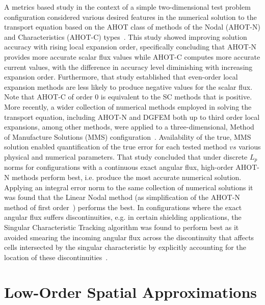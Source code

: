 A metrics based study in the context of a simple two-dimensional test problem configuration considered various desired features in the numerical solution to the transport equation based on the \ac{AHOT} class of methods of the Nodal (\ac{AHOT-N}) and Characteristics (\ac{AHOT-C}) types~\cite{Azmy1992}.
This study showed improving solution accuracy with rising local expansion order, specifically concluding that \ac{AHOT-N} provides more accurate scalar flux values while \ac{AHOT-C} computes more accurate current values, with the difference in accuracy level diminishing with increasing expansion order.
Furthermore, that study established that even-order local expansion methods are less likely to produce negative values for the scalar flux.
Note that \ac{AHOT-C} of order 0 is equivalent to the \ac{SC} methods that is positive.
More recently, a wider collection of numerical methods employed in solving the transport equation, including \ac{AHOT-N} and \ac{DGFEM} both up to third order local expansions, among other methods, were applied to a three-dimensional, Method of Manufacture Solutions (MMS) configuration~\cite{Schunert2015}.
Availability of the true, MMS solution enabled quantification of the true error for each tested method $vs$ various physical and numerical parameters.
That study concluded that under discrete $L_p$ norms for configurations with a continuous exact angular flux, high-order \ac{AHOT-N} methods perform best, i.e. produce the most accurate numerical solution.
Applying an integral error norm to the same collection of numerical solutions it was found that the Linear Nodal method (as simplification of the \ac{AHOT-N} method of first order~\cite{Azmy1988}) performs the best.
In configurations where the exact angular flux suffers discontinuities, e.g. in certain shielding applications, the Singular Characteristic Tracking algorithm was found to perform best as it avoided smearing the incoming angular flux across the discontinuity that affects cells intersected by the singular characteristic by explicitly accounting for the location of these discontinuities~\cite{Duo2009}.

\section{Low-Order Spatial Approximations}

